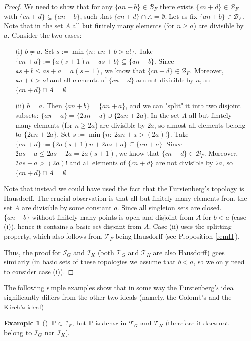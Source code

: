 \documentclass{amsart}
\theoremstyle{definition}
\newtheorem{ex}[thm]{Example}
\newcommand{\I}{\mathcal I}
\newcommand{\T}{\mathcal{T}}
\newcommand{\B}{\mathcal{B}}
\newcommand{\arithseq}[2]{\{#1n + #2\}}
\begin{document}
\begin{proof}
We need to show that for any $\arithseq{a}{b} \in \B_F$ there exists $\arithseq{c}{d} \in \B_F$ with $\arithseq{c}{d} \subseteq \arithseq{a}{b}$, such that $\arithseq{c}{d}\cap A = \emptyset$. Let us fix $\arithseq{a}{b} \in \B_F$. Note that in the set $A$ all but finitely many elements (for $n\geq a$) are divisible by $a$. Consider the two cases:
\begin{itemize}
 \item[(i)] $b\neq a$. Set $s:= \min \{n :\ an+b>a!\}$. Take $\arithseq{c}{d} := \arithseq{a(s+1)}{as+b}\subseteq \arithseq{a}{b}$. Since $as+b\leq as+a = a(s+1)$, we know that $\arithseq{c}{d}\in \B_F$. Moreover, $as+b>a!$ and all elements of $\arithseq{c}{d}$ are not divisible by $a$, so $\arithseq{c}{d}\cap A = \emptyset$.
 \item[(ii)] $b=a$. Then $\arithseq{a}{b} = \arithseq{a}{a}$, and we can "split" it into two disjoint subsets: $\{an+a\} = \{2an+a\}\cup \{2an+2a\}$. In the set $A$ all but finitely many elements (for $n\geq 2a$) are divisible by $2a$, so almost all elements belong to $\{2an+2a\}$. Set $s:= \min \{n :\ 2an+a>(2a)!\}$. Take $\{cn+d\} := \{2a(s+1)n+2as+a\} \subseteq \{an+a\}$. Since $2as+a\leq 2as+2a = 2a(s+1)$, we know that $\{cn+d\}\in \B_F$. Moreover, $2as+a>(2a)!$ and all elements of $\{cn+d\}$ are not divisible by $2a$, so $\{cn+d\}\cap A = \emptyset$.
\end{itemize}

Note that instead we could have used the fact that the Furstenberg's topology is Hausdorff. The crucial observation is that all but finitely many elements from the set $A$ are divisible by some constant $a$. Since all singleton sets are closed, $\{an+b\}$ without finitely many points is open and disjoint from $A$ for $b<a$ (case (i)), hence it contains a basic set disjoint from $A$. Case (ii) uses the splitting property, which also follows from $\T_F$ being Hausdorff (see Proposition \ref{remH}).

Thus, the proof for $\I_G$ and $\I_K$ (both $\T_G$ and $\T_K$ are also Hausdorff) goes similarly (in basic sets of these topologies we assume that $b<a$, so we only need to consider case (i)).
\end{proof}

The following simple examples show that in some way the Furstenberg's ideal significantly differs from the other two ideals (namely, the Golomb's and the Kirch's ideal).

\begin{ex}[{\cite[Section 5]{Szczuka4}}] \label{primes}
$\mathbb{P}\in \I_F$, but $\mathbb{P}$ is dense in $\T_G$ and $\T_K$ (therefore it does not belong to $\I_G$ nor $\I_K$).
\end{ex}
\end{document}
